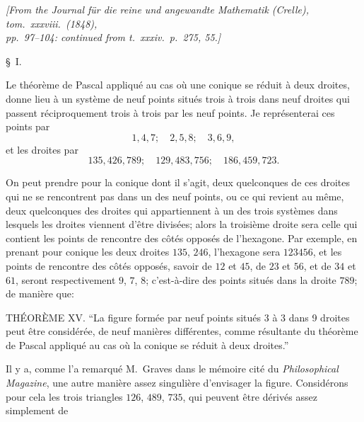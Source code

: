 \documentclass[11pt]{article}
\begin{document}
\medskip

\begin{center}
\textit{[From the Journal f\"ur die reine und angewandte Mathematik (Crelle), tom.\ xxxviii.\ (1848),\\
pp.\ 97--104: continued from t.\ xxxiv.\ p.\ 275, 55.]}
\end{center}

\medskip

\begin{center}\S\ I.\end{center}

\medskip

Le th\'eor\`eme de Pascal appliqu\'e au cas o\`u une conique se r\'eduit \`a deux droites,
donne lieu \`a un syst\`eme de neuf points situ\'es trois \`a trois dans neuf droites qui
passent r\'eciproquement trois \`a trois par les neuf points. Je repr\'esenterai ces points par
\[
1, 4, 7;\quad 2, 5, 8;\quad 3, 6, 9,
\]
et les droites par
\[
135, 426, 789;\quad 129, 483, 756;\quad 186, 459, 723.
\]

\medskip

On peut prendre pour la conique dont il s'agit, deux quelconques de ces droites
qui ne se rencontrent pas dans un des neuf points, ou ce qui revient au m\^eme, deux
quelconques des droites qui appartiennent \`a un des trois syst\`emes dans lesquels les
droites viennent d'\^etre divis\'ees; alors la troisi\`eme droite sera celle qui contient les points
de rencontre des c\^ot\'es oppos\'es de l'hexagone. Par exemple, en prenant pour conique
les deux droites $135$, $246$, l'hexagone sera $123456$, et les points de rencontre des c\^ot\'es
oppos\'es, savoir de $12$ et $45$, de $23$ et $56$, et de $34$ et $61$, seront respectivement $9$, $7$, $8$;
c'est-\`a-dire des points situ\'es dans la droite $789$; de mani\`ere que:

\medskip

TH\'EOR\`EME XV. ``La figure form\'ee par neuf points situ\'es 3 \`a 3 dans 9 droites peut
\^etre consid\'er\'ee, de neuf mani\`eres diff\'erentes, comme r\'esultante du th\'eor\`eme de Pascal
appliqu\'e au cas o\`u la conique se r\'eduit \`a deux droites.''

\medskip

Il y a, comme l'a remarqu\'e M.\ Graves dans le m\'emoire cit\'e du \textit{Philosophical
Magazine}, une autre mani\`ere assez singuli\`ere d'envisager la figure. Consid\'erons pour
cela les trois triangles $126$, $489$, $735$, qui peuvent \^etre d\'eriv\'es assez simplement de
\end{document}

